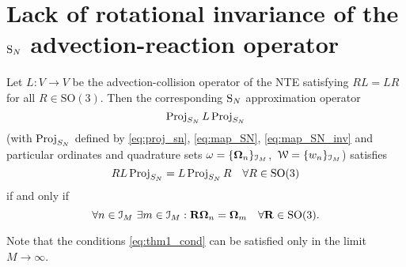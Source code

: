 \chapter{Lack of rotational invariance of the $\SN$ advection-reaction operator}

\begin{theorem*}\label{thm:commut_NTE}
Let $L : V\to V$ be the advection-collision operator of the NTE satisfying
$RL = LR$ for all $R\in\mathrm{SO}(3)$. 
Then the corresponding $\SN$ approximation operator
\begin{equation}\label{eq:sn_op_app}
	\Projop[S_N]\op{L}\Projop[S_N]
\end{equation}
(with $\Projop[S_N]$ defined by \eqref{eq:proj_sn}, \eqref{eq:map_SN}, \eqref{eq:map_SN_inv} and particular
ordinates and quadrature sets \mbox{$\omega = \{\bomega_n\}_{\idxset{M}}$, $\mathcal{W} = \{w_n\}_{\idxset{M}}$})
satisfies $$
\op{R}\op{L}\Projop[S_N] = \op{L}\Projop[S_N]\op{R}\quad \forall R\in\mathrm{SO}(3)
$$
if and only if
\begin{equation}\label{eq:thm1_cond}
	\forall n\in \idxset{M}\ \exists m\in\idxset{M}: \mat{R}\bomega_n = \bomega_m \quad \forall \mat{R}\in\mathrm{SO}(3).
\end{equation} 
\end{theorem*}
\begin{remark*}
	Note that the conditions \eqref{eq:thm1_cond} can be satisfied only in the limit \mbox{$M\to\infty$}.
\end{remark*}

